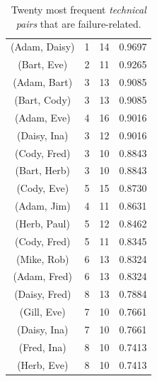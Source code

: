 \begin{table}[t]
\begin{tabular}{@{\hspace{.2cm}}ccc@{\hspace{.75cm}}c@{\hspace{.2cm}}}
(Adam, Daisy)	&	1&	14&	0.9697	\\ %
(Bart, Eve)	&	2&	11&	0.9265	\\ %
(Adam, Bart)	&	3&	13&	0.9085	\\ %
(Bart, Cody)	&	3&	13&	0.9085	\\ %
(Adam, Eve)	&	4&	16&	0.9016	\\ %
(Daisy, Ina)	&	3&	12&	0.9016	\\ %
(Cody, Fred)	&	3&	10&	0.8843	\\ %
(Bart, Herb)	&	3&	10&	0.8843	\\ %
(Cody, Eve)	&	5&	15&	0.8730	\\ %
(Adam, Jim)	&	4&	11&	0.8631	\\ %
(Herb, Paul)	&	5&	12&	0.8462	\\ %
(Cody, Fred)	&	5&	11&	0.8345	\\ %
(Mike, Rob)	&	6&	13&	0.8324	\\ %
(Adam, Fred)	&	6&	13&	0.8324	\\ %
(Daisy, Fred)	&	8&	13&	0.7884	\\ %
(Gill, Eve)		&	7&	10&	0.7661	\\ %
(Daisy, Ina)	&	7&	10&	0.7661	\\ %
(Fred, Ina)	&	8&	10&	0.7413	\\ %
(Herb, Eve)	&	8&	10&	0.7413	\\ %
\bottomrule
\end{tabular}
\caption{Twenty most frequent \emph{technical pairs} that are failure-related.}
\label{tab:badtechpairs}
\end{table}
%

